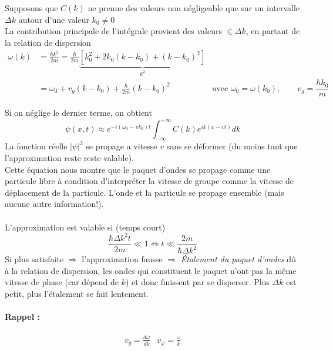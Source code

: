 \documentclass[british,french,11pt, a4paper, openany]{book}
\begin{document}
	Supposons que $C(k)$ ne prenne des valeurs non négligeable que sur un intervalle $\Delta k$ autour d'une valeur $k_0\neq0$\\
	La contribution principale de l'intégrale provient des valeurs $\in\Delta k$, en partant de la relation de dispersion \begin{align}
		\omega(k) & =\frac{\hbar k^2}{2m}=\frac{\hbar}{2m}\underbrace{[k_0^2+2k_0(k-k_0)+(k-k_0)^2]}_{k^2}\\
		& =\omega_0+v_g(k-k_0)+\frac{\hbar}{2m}(k-k_0)^2 &\text{avec } \omega_0=\omega(k_0),\qquad v_g=\dfrac{\hbar k_0}{m}
	\end{align}
	
	Si on néglige le dernier terme, on obtient \begin{equation}\psi(x,t) \approx e^{-i(\omega_0-vk_0)t}\int^{+\infty}_{-\infty}C(k)e^{ik(x-vt)}dk
	\end{equation}
	La fonction réelle $|\psi|^2$ se propage a vitesse $v$ sans se déformer (du moins tant que l'approximation reste reste valable). \\
	Cette équation nous montre que le paquet d'ondes se propage comme une particule libre à condition d'interpréter la vitesse de groupe comme la vitesse de déplacement de la particule. L'onde et la particule se propage ensemble (mais aucune autre information!).\\\\
	L'approximation est valable si (temps court)
	\begin{equation}\frac{\hbar\Delta k^2t}{2m}\ll1\Leftrightarrow t\ll\frac{2m}{\hbar\Delta k^2}\end{equation}
	Si plus satisfaite $\Rightarrow$ l'approximation fausse $\Rightarrow$ \textit{Étalement du paquet d'ondes} dû à la relation de dispersion, les ondes qui constituent le paquet n'ont pas la même vitesse de phase (car dépend de $k$) et donc finissent par se disperser. Plus $\Delta k$ est petit, plus l'étalement se fait lentement.
	\paragraph{Rappel :}
	\begin{equation}
		\begin{array}{cc}
			v_g=\frac{d\omega}{dk} & v_{\varphi}=\frac{\omega}{k} 
		\end{array}{}
	\end{equation}
\end{document}
